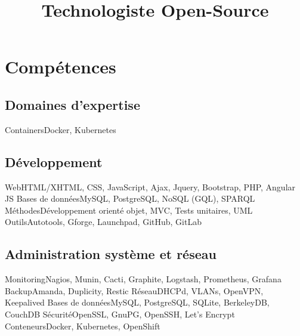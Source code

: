\documentclass[11pt,a4paper]{moderncv}
\title{Technologiste Open-Source}
\begin{document}
\setmainfont{Minion Pro}
\setsansfont{Myriad Pro}

\maketitle

\renewcommand{\labelitemi}{-- }


\section{Comp\'etences}

\subsection{Domaines d'expertise}
           {Containers}{Docker, Kubernetes}

\subsection{D\'eveloppement}
           {Web}{HTML/XHTML, CSS, JavaScript, Ajax, Jquery, Bootstrap, PHP, Angular JS}
           {Bases de donn\'ees}{MySQL, PostgreSQL, NoSQL (GQL), SPARQL}
           {M\'ethodes}{D\'eveloppement orient\'e objet, MVC, Tests unitaires, UML}
           {Outils}{Autotools, Gforge, Launchpad, GitHub, GitLab}

\subsection{Administration syst\`eme et r\'eseau}
           {Monitoring}{Nagios, Munin, Cacti, Graphite, Logstash, Prometheus, Grafana}
           {Backup}{Amanda, Duplicity, Restic}
           {R\'eseau}{DHCPd, VLANs, OpenVPN, Keepalived}
           {Bases de donn\'ees}{MySQL, PostgreSQL, SQLite, BerkeleyDB, CouchDB}
           {S\'ecurit\'e}{OpenSSL, GnuPG, OpenSSH, Let's Encrypt}
           {Conteneurs}{Docker, Kubernetes, OpenShift}
\end{document}
